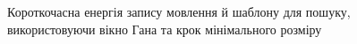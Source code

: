         \begin{figure}[h]
            \centering

            \caption{Короткочасна енергія запису мовлення й шаблону для пошуку, використовуючи вікно Гана та крок
                мінімального розміру}
            \label{fig:audio-energy-han-min}
        \end{figure}

